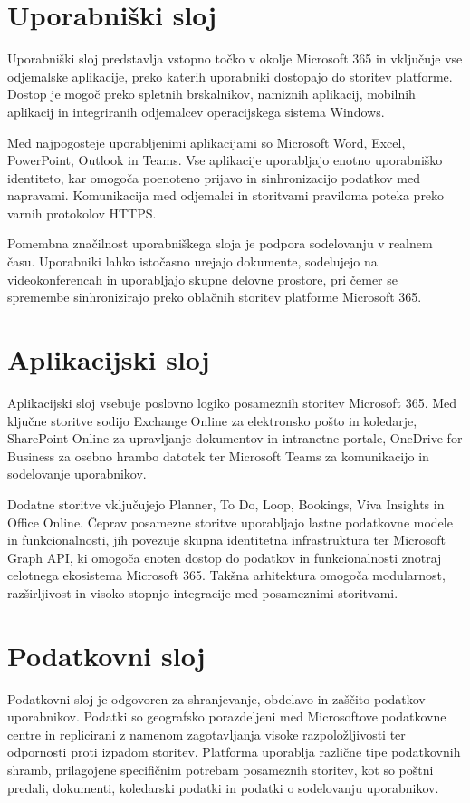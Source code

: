 \documentclass[a4paper, 12pt]{book}
\begin{document}
\section{Uporabniški sloj}

Uporabniški sloj predstavlja vstopno točko v okolje Microsoft 365 in vključuje vse odjemalske aplikacije, preko katerih uporabniki dostopajo do storitev platforme.
Dostop je mogoč preko spletnih brskalnikov, namiznih aplikacij, mobilnih aplikacij in integriranih odjemalcev operacijskega sistema Windows.

Med najpogosteje uporabljenimi aplikacijami so Microsoft Word, Excel, PowerPoint, Outlook in Teams.
Vse aplikacije uporabljajo enotno uporabniško identiteto, kar omogoča poenoteno prijavo in sinhronizacijo podatkov med napravami.
Komunikacija med odjemalci in storitvami praviloma poteka preko varnih protokolov HTTPS.

Pomembna značilnost uporabniškega sloja je podpora sodelovanju v realnem času.
Uporabniki lahko istočasno urejajo dokumente, sodelujejo na videokonferencah in uporabljajo skupne delovne prostore, pri čemer se spremembe sinhronizirajo preko oblačnih storitev platforme Microsoft 365.


\section{Aplikacijski sloj}

Aplikacijski sloj vsebuje poslovno logiko posameznih storitev Microsoft 365.
Med ključne storitve sodijo Exchange Online za elektronsko pošto in koledarje, SharePoint Online za upravljanje dokumentov in intranetne portale, OneDrive for Business za osebno hrambo datotek ter Microsoft Teams za komunikacijo in sodelovanje uporabnikov.

Dodatne storitve vključujejo Planner, To Do, Loop, Bookings, Viva Insights in Office Online. Čeprav posamezne storitve uporabljajo lastne podatkovne modele in funkcionalnosti, jih povezuje skupna identitetna infrastruktura ter Microsoft Graph API, ki omogoča enoten dostop do podatkov in funkcionalnosti znotraj celotnega ekosistema Microsoft 365.
Takšna arhitektura omogoča modularnost, razširljivost in visoko stopnjo integracije med posameznimi storitvami.


\section{Podatkovni sloj}

Podatkovni sloj je odgovoren za shranjevanje, obdelavo in zaščito podatkov uporabnikov.
Podatki so geografsko porazdeljeni med Microsoftove podatkovne centre in replicirani z namenom zagotavljanja visoke razpoložljivosti ter odpornosti proti izpadom storitev.
Platforma uporablja različne tipe podatkovnih shramb, prilagojene specifičnim potrebam posameznih storitev, kot so poštni predali, dokumenti, koledarski podatki in podatki o sodelovanju uporabnikov.
\end{document}
